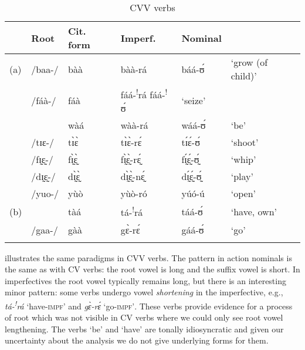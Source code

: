 \documentclass[output=paper
,newtxmath
,modfonts
,nonflat]{langsci/langscibook}
\begin{document}
\begin{table}
\begin{tabularx}{\textwidth}{lllllX}
\lsptoprule
& {Root} & {Cit. form} & {Imperf.} & {Nominal} & \\
\midrule
(a)	&/baa-/	&bàà	&bàà-rá	&báá-ʊ́	&‘grow (of child)’\\
	&/fáà-/ &    	fáà &	fáá-\textsuperscript{!}rá	fáá-\textsuperscript{!}ʊ́	&‘seize’\\
	&	&	wàá	& wàà-rá	&wáá-ʊ́	& ‘be’\\
	&/tɪɛ-/&	tɪ̀ɛ̀	& tɪ̀ɛ̀-rɛ́	&tɪ́ɛ́-ʊ́	& ‘shoot’\\
	&/fɪ̰ɛ̰-/&	fɪ̰̀ɛ̰̀	& fɪ̰̀ɛ̰̀-rɛ̰́	&fɪ̰́ɛ̰́-ʊ̰́	& ‘whip’\\
	&/dɪ̰ɛ̰-/&	dɪ̰̀ɛ̰̀	& dɪ̰̀ɛ̰̀-nɛ̰́	&dɪ̰́ɛ̰́-ʊ̰́	& ‘play’\\
	&/yuo-/	&yùò	& yùò-ró	&yúó-ú	& ‘open’\\
(b)	&&tàá	& tá-\textsuperscript{!}rá	& táá-ʊ́ & ‘have, own’\\
	&/gaa-/	&gàà	& gɛ̀-rɛ́	&gáá-ʊ́	& ‘go’\\
\lspbottomrule
\end{tabularx}
\caption{CVV verbs}
\label{tab:anttila:8}
\end{table}

  illustrates the same paradigms in CVV verbs. The pattern in action nominals is the same as with CV verbs: the root vowel is long and the suffix vowel is short. In imperfectives the root vowel typically remains long, but there is an interesting minor pattern: some verbs undergo vowel \textit{shortening} in the imperfective, e.g., \textit{tá-\textsuperscript{!}}\textit{rá} ‘have-\textsc{impf}’ and \textit{gɛ̀-rɛ́} ‘go-\textsc{impf’}.\footnotemark{} These verbs provide evidence for a process of root  which was not visible in CV verbs where we could only see root vowel lengthening. The verbs ‘be’ and ‘have’ are tonally idiosyncratic and given our uncertainty about the analysis we do not give underlying forms for them.

\end{document}
